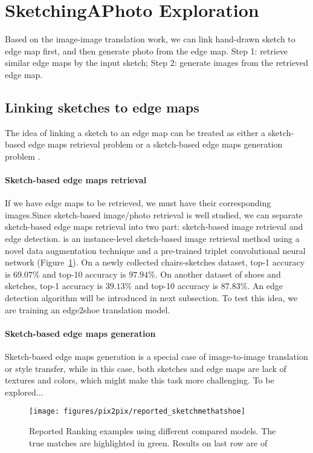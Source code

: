 \section{SketchingAPhoto Exploration}
Based on the image-image translation work, we can link hand-drawn sketch to edge map first, and then generate photo from the edge map. Step 1: retrieve similar edge maps by the input sketch; Step 2: generate images from the retrieved edge map.
\subsection{Linking sketches to edge maps}
The idea of linking a sketch to an edge map can be treated as either a sketch-based edge maps retrieval problem or a sketch-based edge maps generation problem .
\paragraph{Sketch-based edge maps retrieval}
If we have edge maps to be retrieved, we must have their corresponding images.Since sketch-based image/photo retrieval is well studied, we can separate sketch-based edge maps retrieval into two part: sketch-based image retrieval and edge detection. \cite{SketchMeThatShoe} is an instance-level sketch-based image retrieval method using a novel data augmentation technique and a pre-trained triplet convolutional neural network (Figure~\ref{reported_sketchmethatshoe}). On a newly collected chairs-sketches dataset, top-1 accuracy is $69.07\%$ and top-10 accuracy is $97.94\%$. On another dataset of shoes and sketches, top-1 accuracy is $39.13\%$ and top-10 accuracy is $87.83\%$. An edge detection algorithm will be introduced in next subsection. To test this idea, we are training an edge2shoe translation model.
\paragraph{Sketch-based edge maps generation}
Sketch-based edge maps generation is a special case of image-to-image translation or style transfer, while in this case, both sketches and edge maps are lack of textures and colors, which might make this task more challenging. 
To be explored...

\begin{figure}
	\texttt{[image: figures/pix2pix/reported\_sketchmethatshoe]}
	\caption{\label{reported_sketchmethatshoe}Reported Ranking examples using different compared models. The true matches are highlighted in green. Results on last row are of \cite{SketchMeThatShoe}}
\end{figure}

